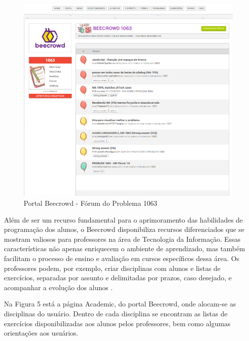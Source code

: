 \begin{figure}[h!]
	   \centering
            \caption{Portal Beecrowd - Fórum do Problema 1063}
            \label{fig:ModeloConceitual}
	   	\includegraphics[scale=0.3]{pictures/beecrowd_1063.png}
\end{figure}

Além de ser um recurso fundamental para o aprimoramento das habilidades de programação dos alunos, o Beecrowd disponibiliza recursos diferenciados que se mostram valiosos para professores na área de Tecnologia da Informação. Essas características não apenas enriquecem o ambiente de aprendizado, mas também facilitam o processo de ensino e avaliação em cursos específicos dessa área. Os professores podem, por exemplo, criar disciplinas com alunos e listas de exercícios, separadas por assunto e delimitadas por prazos, caso desejado, e acompanhar a evolução dos alunos \cite[p.~239]{beztonin2014}.

Na Figura 5 está a página Academic, do portal Beecrowd, onde alocam-se as disciplinas do usuário. Dentro de cada disciplina se encontram as listas de exercícios disponibilizadas aos alunos pelos professores, bem como algumas orientações aos usuários.

